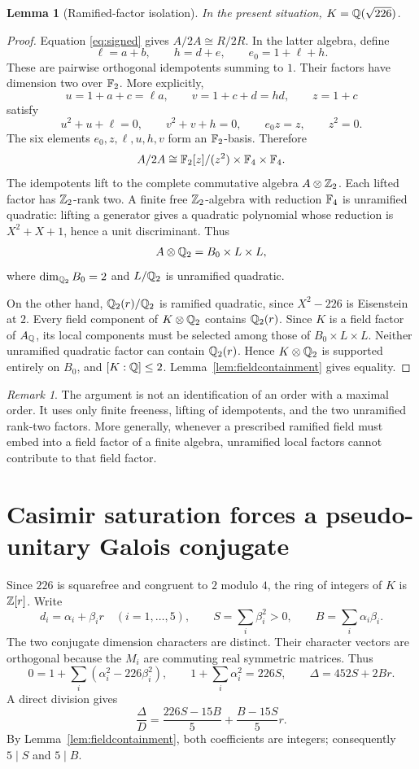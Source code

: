 \documentclass[11pt]{article}
\newtheorem{lemma}[theorem]{Lemma}
\theoremstyle{remark}\newtheorem{remark}[theorem]{Remark}
\begin{document}
\begin{lemma}[Ramified-factor isolation]\label{lem:ramification}
In the present situation, $K=\mathbb Q(\sqrt{226})$.
\end{lemma}
\begin{proof}
Equation \eqref{eq:signed} gives $A/2A\cong R/2R$. In the latter algebra, define
\[
\ell=a+b,\qquad h=d+e,\qquad e_0=1+\ell+h.
\]
These are pairwise orthogonal idempotents summing to $1$. Their factors have dimension two over $\mathbb F_2$. More explicitly,
\[
u=1+a+c=\ell a,\qquad v=1+c+d=hd,\qquad z=1+c
\]
satisfy
\[
u^2+u+\ell=0,\qquad v^2+v+h=0,\qquad e_0z=z,\qquad z^2=0.
\]
The six elements $e_0,z,\ell,u,h,v$ form an $\mathbb F_2$-basis. Therefore
\begin{equation}\label{eq:mod2}
A/2A\cong\mathbb F_2[z]/(z^2)\times\mathbb F_4\times\mathbb F_4.
\end{equation}
The idempotents lift to the complete commutative algebra $A\otimes\mathbb Z_2$. Each lifted factor has $\mathbb Z_2$-rank two. A finite free $\mathbb Z_2$-algebra with reduction $\mathbb F_4$ is unramified quadratic: lifting a generator gives a quadratic polynomial whose reduction is $X^2+X+1$, hence a unit discriminant. Thus
\[
A\otimes\mathbb Q_2=B_0\times L\times L,
\]
where $\dim_{\mathbb Q_2}B_0=2$ and $L/\mathbb Q_2$ is unramified quadratic.

On the other hand, $\mathbb Q_2(r)/\mathbb Q_2$ is ramified quadratic, since $X^2-226$ is Eisenstein at $2$. Every field component of $K\otimes\mathbb Q_2$ contains $\mathbb Q_2(r)$. Since $K$ is a field factor of $A_\mathbb Q$, its local components must be selected among those of $B_0\times L\times L$. Neither unramified quadratic factor can contain $\mathbb Q_2(r)$. Hence $K\otimes\mathbb Q_2$ is supported entirely on $B_0$, and $[K:\mathbb Q]\le2$. Lemma~\ref{lem:fieldcontainment} gives equality.
\end{proof}

\begin{remark}
The argument is not an identification of an order with a maximal order. It uses only finite freeness, lifting of idempotents, and the two unramified rank-two factors. More generally, whenever a prescribed ramified field must embed into a field factor of a finite algebra, unramified local factors cannot contribute to that field factor.
\end{remark}

\section{Casimir saturation forces a pseudo-unitary Galois conjugate}
Since $226$ is squarefree and congruent to $2$ modulo $4$, the ring of integers of $K$ is $\mathbb Z[r]$. Write
\[
d_i=\alpha_i+\beta_i r\quad(i=1,\ldots,5),\qquad
S=\sum_i\beta_i^2>0,\qquad B=\sum_i\alpha_i\beta_i.
\]
The two conjugate dimension characters are distinct. Their character vectors are orthogonal because the $M_i$ are commuting real symmetric matrices. Thus
\[
0=1+\sum_i(\alpha_i^2-226\beta_i^2),
\qquad 1+\sum_i\alpha_i^2=226S,
\qquad\Delta=452S+2Br.
\]
A direct division gives
\begin{equation}\label{eq:ratio}
\frac\Delta D=\frac{226S-15B}{5}+\frac{B-15S}{5}r.
\end{equation}
By Lemma~\ref{lem:fieldcontainment}, both coefficients are integers; consequently $5\mid S$ and $5\mid B$.
\end{document}
